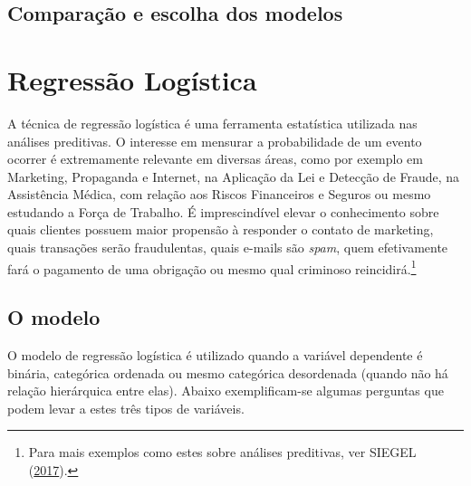 \documentclass[12pt,brazil,oneside]{book}
\let\rmarkdownfootnote\footnote%
\def\footnote{\protect\rmarkdownfootnote}
\begin{document}
\hypertarget{comparacao-e-escolha-dos-modelos}{%
\section{Comparação e escolha dos
modelos}\label{comparacao-e-escolha-dos-modelos}}

\hypertarget{regressao-logistica}{%
\chapter{Regressão Logística}\label{regressao-logistica}}

A técnica de regressão logística é uma ferramenta estatística utilizada
nas análises preditivas. O interesse em mensurar a probabilidade de um
evento ocorrer é extremamente relevante em diversas áreas, como por
exemplo em Marketing, Propaganda e Internet, na Aplicação da Lei e
Detecção de Fraude, na Assistência Médica, com relação aos Riscos
Financeiros e Seguros ou mesmo estudando a Força de Trabalho. É
imprescindível elevar o conhecimento sobre quais clientes possuem maior
propensão à responder o contato de marketing, quais transações serão
fraudulentas, quais e-mails são \emph{spam}, quem efetivamente fará o
pagamento de uma obrigação ou mesmo qual criminoso reincidirá.\footnote{Para
  mais exemplos como estes sobre análises preditivas, ver SIEGEL
  (\protect\hyperlink{ref-Siegel2017}{2017}).}

\hypertarget{o-modelo}{%
\section{O modelo}\label{o-modelo}}

O modelo de regressão logística é utilizado quando a variável dependente
é binária, categórica ordenada ou mesmo categórica desordenada (quando
não há relação hierárquica entre elas). Abaixo exemplificam-se algumas
perguntas que podem levar a estes três tipos de variáveis.
\end{document}
